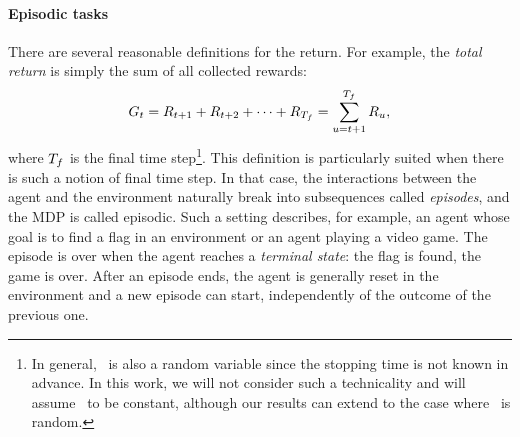				\paragraph{Episodic tasks} There are several reasonable definitions for the return. For example, the\emph{ total return} is simply the sum of all collected rewards:
				\begin{equation}
					G_t = R_{t+1} + R_{t+2}  + \cdots + R_{{T_f}} = \sum_{u=t+1}^{{T_f}} R_u, \label{eq:total return}
				\end{equation}
				where ${T_f}$ is the final time step\footnote{In general, \Tf~is also a random variable since the stopping time is not known in advance. In this work, we will not consider such a technicality and will assume \Tf~to be constant, although our results can extend to the case where \Tf~is random.}. This definition is particularly suited when there is such a notion of final time step. In that case, the interactions between the agent and the environment naturally break into subsequences called\emph{ episodes}, and the MDP is called episodic. Such a setting describes, for example, an agent whose goal is to find a flag in an environment or an agent playing a video game. The episode is over when the agent reaches a\emph{ terminal state}: the flag is found, the game is over. After an episode ends, the agent is generally reset in the environment and a new episode can start, independently of the outcome of the previous one. 
				
